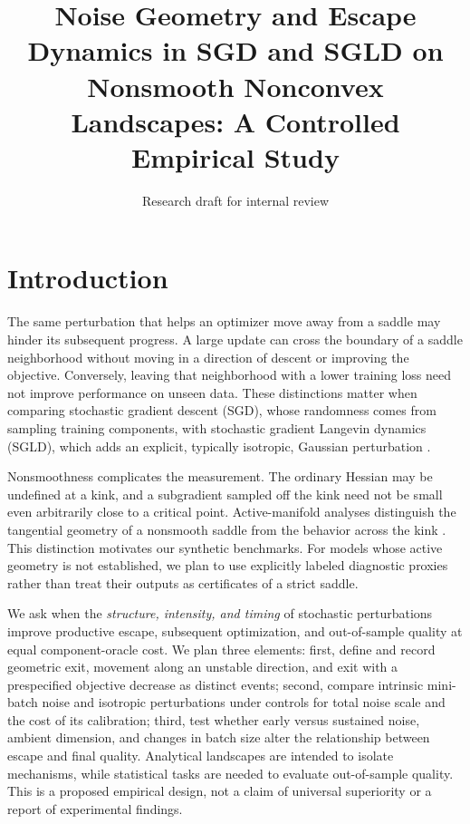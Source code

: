 \documentclass[11pt]{article}
\title{Noise Geometry and Escape Dynamics in SGD and SGLD on Nonsmooth
Nonconvex Landscapes: A Controlled Empirical Study}
\author{Research draft for internal review}
\date{}
\begin{document}
\maketitle

\section{Introduction}

The same perturbation that helps an optimizer move away from a saddle may
hinder its subsequent progress. A large update can cross the boundary of a
saddle neighborhood without moving in a direction of descent or improving
the objective. Conversely, leaving that neighborhood with a lower training
loss need not improve performance on unseen data. These distinctions matter
when comparing stochastic gradient descent (SGD), whose randomness comes from
sampling training components, with stochastic gradient Langevin dynamics
(SGLD), which adds an explicit, typically isotropic, Gaussian perturbation
\citep{raginsky2017,zhu2019}.

Nonsmoothness complicates the measurement. The ordinary Hessian may be
undefined at a kink, and a subgradient sampled off the kink need not be small
even arbitrarily close to a critical point. Active-manifold analyses
distinguish the tangential geometry of a nonsmooth saddle from the behavior
across the kink \citep{bianchi2023}. This distinction motivates our
synthetic benchmarks. For models whose active geometry is not established, we
plan to use explicitly labeled diagnostic proxies rather than treat their
outputs as certificates of a strict saddle.

We ask when the \emph{structure, intensity, and timing} of stochastic
perturbations improve productive escape, subsequent optimization, and
out-of-sample quality at equal component-oracle cost. We plan three elements:
first, define and record geometric exit, movement along an unstable
direction, and exit with a prespecified objective decrease as distinct
events; second, compare intrinsic mini-batch noise and isotropic perturbations
under controls for total noise scale and the cost of its calibration; third,
test whether early versus sustained noise, ambient dimension, and changes in
batch size alter the relationship between escape and final quality. Analytical
landscapes are intended to isolate mechanisms, while statistical tasks are
needed to evaluate out-of-sample quality. This is a proposed empirical design,
not a claim of universal superiority or a report of experimental findings.
\end{document}
